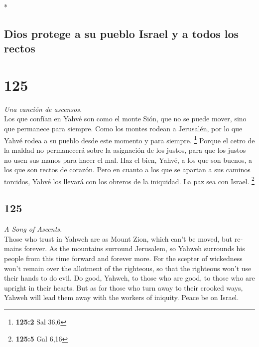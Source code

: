 \begin{paracol}{2}
\begin{otherlanguage}{english}
\end{otherlanguage}

\switchcolumn[0]*

\hypertarget{dios-protege-a-su-pueblo-israel-y-a-todos-los-rectos}{%
\subsection{Dios protege a su pueblo Israel y a todos los
rectos}\label{dios-protege-a-su-pueblo-israel-y-a-todos-los-rectos}}

\hypertarget{section-248}{%
\section{125}\label{section-248}}

\emph{Una canción de ascensos.}\\
 Los que confían en Yahvé son como el monte Sión, que no
se puede mover, sino que permanece para siempre.  Como los
montes rodean a Jerusalén, por lo que Yahvé rodea a su pueblo desde este
momento y para siempre. \footnote{\textbf{125:2} Sal 36,6}
 Porque el cetro de la maldad no permanecerá sobre la
asignación de los justos, para que los justos no usen sus manos para
hacer el mal.  Haz el bien, Yahvé, a los que son buenos, a
los que son rectos de corazón.  Pero en cuanto a los que
se apartan a sus caminos torcidos, Yahvé los llevará con los obreros de
la iniquidad. La paz sea con Israel. \footnote{\textbf{125:5} Gal 6,16}

\switchcolumn
\begin{otherlanguage}{english}

\hypertarget{section-249}{%
\section{125}\label{section-249}}

\emph{A Song of Ascents.}\\
 Those who trust in Yahweh are as Mount Zion, which can't
be moved, but remains forever.  As the mountains surround
Jerusalem, so Yahweh surrounds his people from this time forward and
forever more.  For the scepter of wickedness won't remain
over the allotment of the righteous, so that the righteous won't use
their hands to do evil.  Do good, Yahweh, to those who are
good, to those who are upright in their hearts.  But as
for those who turn away to their crooked ways, Yahweh will lead them
away with the workers of iniquity. Peace be on Israel.


\end{otherlanguage}
\end{paracol}
